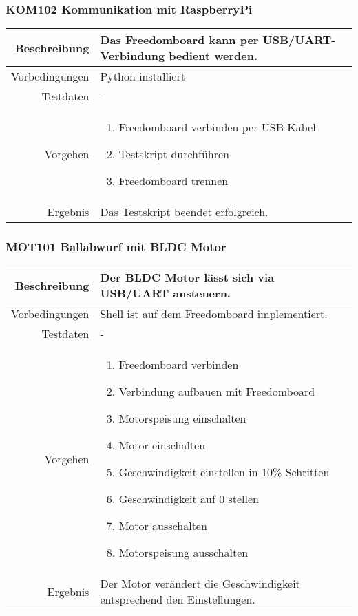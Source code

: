 \subsubsection{KOM102 Kommunikation mit RaspberryPi}
\begin{table}[h!]
	\renewcommand{\arraystretch}{1.5}
	\begin{tabular}{|r|p{14cm}|}
		\hline Beschreibung	&
			Das Freedomboard kann per USB/UART-Verbindung bedient werden. \\ 
		\hline Vorbedingungen	& Python installiert \\ 
		\hline Testdaten	& - \\ 
		\hline Vorgehen		& 
		\begin{enumerate}
			\item Freedomboard verbinden per USB Kabel
			\item Testskript durchführen
			\item Freedomboard trennen
		\end{enumerate} \\ 
		\hline Ergebnis 	&
			Das Testskript beendet erfolgreich.\\ 
		\hline 
	\end{tabular}
\end{table}

\newpage
\subsubsection{MOT101 Ballabwurf mit BLDC Motor}
\begin{table}[h!]
	\renewcommand{\arraystretch}{1.5}
	\begin{tabular}{|r|p{14cm}|}
		\hline Beschreibung	& Der BLDC Motor lässt sich via USB/UART ansteuern. \\ 
		\hline Vorbedingungen	& Shell ist auf dem Freedomboard implementiert. \\ 
		\hline Testdaten	& - \\ 
		\hline Vorgehen		& 
		\begin{enumerate}
			\item Freedomboard verbinden
			\item Verbindung aufbauen mit Freedomboard
			\item Motorspeisung einschalten
			\item Motor einschalten
			\item Geschwindigkeit einstellen in 10\% Schritten
			\item Geschwindigkeit auf 0 stellen
			\item Motor ausschalten
			\item Motorspeisung ausschalten 
		\end{enumerate} \\ 
		\hline Ergebnis 	&
			Der Motor verändert die Geschwindigkeit entsprechend
			den Einstellungen.\\ 
		\hline 
	\end{tabular}
\end{table}

